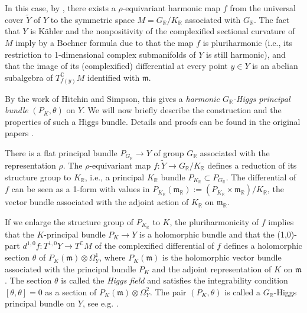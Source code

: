 \documentclass[10pt]{article}
\theoremstyle{definition}
\numberwithin{equation}{section}
\begin{document}
In this case, by \cite{jep93Cor88}, there exists a $\rho$-equivariant harmonic map $f$ from the universal cover $\widetilde Y$ of $Y$ to the symmetric space $M=G_{\mathbb R}/K_{\mathbb R}$ associated with $G_{\mathbb R}$. The fact that $Y$ is Kähler and the nonpositivity of the complexified sectional curvature of $M$ imply by a Bochner formula due to \cite{jep93Sam78,jep93Siu80} that the map $f$ is pluriharmonic (i.e., its restriction to 1-dimensional complex submanifolds of $Y$ is still harmonic), and that the image of its (complexified) differential at every point $y\in Y$ is an abelian subalgebra of $T^{\mathbb C}_{f(y)}M$ identified with $\mathfrak m$.

By the work of Hitchin and Simpson, this gives a \emph{harmonic $G_{\mathbb R}$-Higgs principal bundle} $(P_K,\theta)$ on $Y$. We will now briefly describe the construction and the properties of such a Higgs bundle. Details and proofs can be found in the original papers \cite{jep93Hit87,jep93Hit92,jep93Sim88,jep93Sim92}.

There is a flat principal bundle $P_{G_{\mathbb R}}\to Y$ of group $G_{\mathbb R}$ associated with the representation $\rho$. The $\rho$-equivariant map $f:\widetilde Y\to G_{\mathbb R}/K_{\mathbb R}$ defines a reduction of its structure group to $K_{\mathbb R}$, i.e., a principal $K_{\mathbb R}$ bundle $P_{K_{\mathbb R}}\subset P_{G_{\mathbb R}}$. The differential of $f$ can be seen as a 1-form with values in $P_{K_{\mathbb R}}(\mathfrak m_{\mathbb R}):=(P_{K_{\mathbb R}}\times\mathfrak m_{\mathbb R})/K_{\mathbb R}$, the vector bundle associated with the adjoint action of $K_{\mathbb R}$ on $\mathfrak m_{\mathbb R}$.

If we enlarge the structure group of $P_{K_{\mathbb R}}$ to $K$, the pluriharmonicity of $f$ implies that the $K$-principal bundle $P_K\to Y$ is a holomorphic bundle and that the (1,0)-part $d^{1,0}f:T^{1,0}Y\to T^{\mathbb C}M$ of the complexified differential of $f$ defines a holomorphic section $\theta$ of $P_K(\mathfrak m)\otimes\Omega_Y^1$, where $P_K(\mathfrak m)$ is the holomorphic vector bundle associated with the principal bundle $P_K$ and the adjoint representation of $K$ on $\mathfrak m$. The section $\theta$ is called the \emph{Higgs field} and satisfies the integrability condition $[\theta,\theta]=0$ as a section of $P_K(\mathfrak m)\otimes\Omega_Y^2$. The pair $(P_K,\theta)$ is called a $G_{\mathbb R}$-Higgs principal bundle on $Y$, see e.g. \cite[\S2.2]{jep93BGPG06}.
\end{document}

